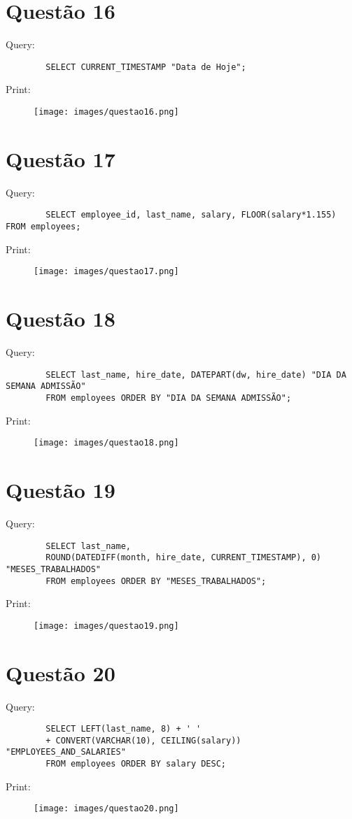 \documentclass{article}[twocolumn]
\begin{document}
	\section{Quest\~ao 16}
	Query:
	\begin{verbatim}
		SELECT CURRENT_TIMESTAMP "Data de Hoje";
	\end{verbatim}
	Print:
	\begin{figure}[H]
		\centering
		\texttt{[image: images/questao16.png]}
	\end{figure}
	\newpage
	\section{Quest\~ao 17}
	Query:
	\begin{verbatim}
		SELECT employee_id, last_name, salary, FLOOR(salary*1.155) FROM employees;
	\end{verbatim}
	Print:
	\begin{figure}[H]
		\centering
		\texttt{[image: images/questao17.png]}
	\end{figure}
	\newpage
	\section{Quest\~ao 18}
	Query:
	\begin{verbatim}
		SELECT last_name, hire_date, DATEPART(dw, hire_date) "DIA DA SEMANA ADMISSÃO"
		FROM employees ORDER BY "DIA DA SEMANA ADMISSÃO";
	\end{verbatim}
	Print:
	\begin{figure}[H]
		\centering
		\texttt{[image: images/questao18.png]}
	\end{figure}
	\newpage
	\section{Quest\~ao 19}
	Query:
	\begin{verbatim}
		SELECT last_name,
		ROUND(DATEDIFF(month, hire_date, CURRENT_TIMESTAMP), 0) "MESES_TRABALHADOS"
		FROM employees ORDER BY "MESES_TRABALHADOS";
	\end{verbatim}
	Print:
	\begin{figure}[H]
		\centering
		\texttt{[image: images/questao19.png]}
	\end{figure}
	\newpage
	\section{Quest\~ao 20}
	Query:
	\begin{verbatim}
		SELECT LEFT(last_name, 8) + ' '
		+ CONVERT(VARCHAR(10), CEILING(salary)) "EMPLOYEES_AND_SALARIES"
		FROM employees ORDER BY salary DESC;
	\end{verbatim}
	Print:
	\begin{figure}[H]
		\centering
		\texttt{[image: images/questao20.png]}
	\end{figure}
\end{document}

